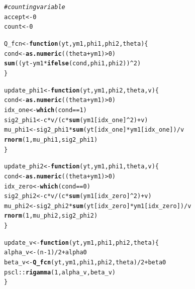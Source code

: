\documentclass[12pt]{article}\usepackage[]{graphicx}\usepackage[]{color}
\makeatletter
\newcommand{\hlnum}[1]{\textcolor[rgb]{0.686,0.059,0.569}{#1}}%
\newcommand{\hlcom}[1]{\textcolor[rgb]{0.678,0.584,0.686}{\textit{#1}}}%
\newcommand{\hlopt}[1]{\textcolor[rgb]{0,0,0}{#1}}%
\newcommand{\hlstd}[1]{\textcolor[rgb]{0.345,0.345,0.345}{#1}}%
\newcommand{\hlkwa}[1]{\textcolor[rgb]{0.161,0.373,0.58}{\textbf{#1}}}%
\newcommand{\hlkwb}[1]{\textcolor[rgb]{0.69,0.353,0.396}{#1}}%
\newcommand{\hlkwc}[1]{\textcolor[rgb]{0.333,0.667,0.333}{#1}}%
\newcommand{\hlkwd}[1]{\textcolor[rgb]{0.737,0.353,0.396}{\textbf{#1}}}%
\newenvironment{kframe}{%
 \def\at@end@of@kframe{}%
 \ifinner\ifhmode%
  \def\at@end@of@kframe{\end{minipage}}%
  \begin{minipage}{\columnwidth}%
 \fi\fi%
 \def\FrameCommand##1{\hskip\@totalleftmargin \hskip-\fboxsep
 \colorbox{shadecolor}{##1}\hskip-\fboxsep
     \hskip-\linewidth \hskip-\@totalleftmargin \hskip\columnwidth}%
 \MakeFramed {\advance\hsize-\width
   \@totalleftmargin\z@ \linewidth\hsize
   \@setminipage}}%
 {\par\unskip\endMakeFramed%
 \at@end@of@kframe}
\newenvironment{knitrout}{}{} %
\makeatother
\begin{document}
\begin{knitrout}
\begin{kframe}
\begin{alltt}
\hlcom{# counting variable}
\hlstd{accept} \hlkwb{<-} \hlnum{0}
\hlstd{count} \hlkwb{<-} \hlnum{0}

\hlstd{Q_fcn} \hlkwb{<-} \hlkwa{function}\hlstd{(}\hlkwc{yt}\hlstd{,} \hlkwc{ym1}\hlstd{,} \hlkwc{phi1}\hlstd{,} \hlkwc{phi2}\hlstd{,} \hlkwc{theta}\hlstd{) \{}
    \hlstd{cond} \hlkwb{<-} \hlkwd{as.numeric}\hlstd{((theta} \hlopt{+} \hlstd{ym1)} \hlopt{>} \hlnum{0}\hlstd{)}
    \hlkwd{sum}\hlstd{((yt} \hlopt{-} \hlstd{ym1} \hlopt{*} \hlkwd{ifelse}\hlstd{(cond, phi1, phi2))} \hlopt{^} \hlnum{2}\hlstd{)}
\hlstd{\}}

\hlstd{update_phi1} \hlkwb{<-} \hlkwa{function}\hlstd{(}\hlkwc{yt}\hlstd{,} \hlkwc{ym1}\hlstd{,} \hlkwc{phi2}\hlstd{,} \hlkwc{theta}\hlstd{,} \hlkwc{v}\hlstd{) \{}
    \hlstd{cond} \hlkwb{<-} \hlkwd{as.numeric}\hlstd{((theta} \hlopt{+} \hlstd{ym1)} \hlopt{>} \hlnum{0}\hlstd{)}
    \hlstd{idx_one} \hlkwb{<-} \hlkwd{which}\hlstd{(cond} \hlopt{==} \hlnum{1}\hlstd{)}
    \hlstd{sig2_phi1} \hlkwb{<-} \hlstd{c} \hlopt{*} \hlstd{v} \hlopt{/} \hlstd{(c} \hlopt{*} \hlkwd{sum}\hlstd{(ym1[idx_one]} \hlopt{^} \hlnum{2}\hlstd{)} \hlopt{+} \hlstd{v)}
    \hlstd{mu_phi1} \hlkwb{<-} \hlstd{sig2_phi1} \hlopt{*} \hlkwd{sum}\hlstd{(yt[idx_one]} \hlopt{*} \hlstd{ym1[idx_one])} \hlopt{/} \hlstd{v}
    \hlkwd{rnorm}\hlstd{(}\hlnum{1}\hlstd{, mu_phi1, sig2_phi1)}
\hlstd{\}}

\hlstd{update_phi2} \hlkwb{<-} \hlkwa{function}\hlstd{(}\hlkwc{yt}\hlstd{,} \hlkwc{ym1}\hlstd{,} \hlkwc{phi1}\hlstd{,} \hlkwc{theta}\hlstd{,} \hlkwc{v}\hlstd{) \{}
    \hlstd{cond} \hlkwb{<-} \hlkwd{as.numeric}\hlstd{((theta} \hlopt{+} \hlstd{ym1)} \hlopt{>} \hlnum{0}\hlstd{)}
    \hlstd{idx_zero} \hlkwb{<-} \hlkwd{which}\hlstd{(cond} \hlopt{==} \hlnum{0}\hlstd{)}
    \hlstd{sig2_phi2} \hlkwb{<-} \hlstd{c} \hlopt{*} \hlstd{v} \hlopt{/} \hlstd{(c} \hlopt{*} \hlkwd{sum}\hlstd{(ym1[idx_zero]} \hlopt{^} \hlnum{2}\hlstd{)} \hlopt{+} \hlstd{v)}
    \hlstd{mu_phi2} \hlkwb{<-} \hlstd{sig2_phi2} \hlopt{*} \hlkwd{sum}\hlstd{(yt[idx_zero]} \hlopt{*} \hlstd{ym1[idx_zero])} \hlopt{/} \hlstd{v}
    \hlkwd{rnorm}\hlstd{(}\hlnum{1}\hlstd{, mu_phi2, sig2_phi2)}
\hlstd{\}}

\hlstd{update_v} \hlkwb{<-} \hlkwa{function}\hlstd{(}\hlkwc{yt}\hlstd{,} \hlkwc{ym1}\hlstd{,} \hlkwc{phi1}\hlstd{,} \hlkwc{phi2}\hlstd{,} \hlkwc{theta}\hlstd{) \{}
    \hlstd{alpha_v} \hlkwb{<-} \hlstd{(n} \hlopt{-} \hlnum{1}\hlstd{)} \hlopt{/} \hlnum{2} \hlopt{+} \hlstd{alpha0}
    \hlstd{beta_v} \hlkwb{<-} \hlkwd{Q_fcn}\hlstd{(yt, ym1, phi1, phi2, theta)} \hlopt{/} \hlnum{2} \hlopt{+} \hlstd{beta0}
    \hlstd{pscl}\hlopt{::}\hlkwd{rigamma}\hlstd{(}\hlnum{1}\hlstd{, alpha_v, beta_v)}
\hlstd{\}}


\end{alltt}
\end{kframe}
\end{knitrout}
\end{document}
